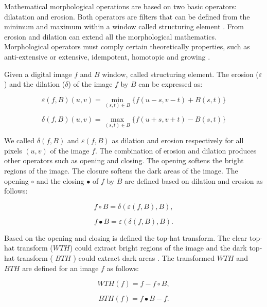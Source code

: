 Mathematical morphological operations are based on two basic operators: dilatation and erosion. Both operators are filters that can be defined from the minimum and maximum within a window called structuring element \cite{serra1986introduction}. From erosion and dilation can extend all the morphological mathematics. Morphological operators must comply certain theoretically properties, such as anti-extensive or extensive, idempotent, homotopic and growing \cite{serra1986introduction}.

Given a digital image $f$ and $B$ window, called structuring element. The erosion ($\varepsilon$) and the dilation ($\delta$) of the image $f$ by $B$ can be expressed as:

\begin{equation}
\varepsilon(f,B)(u,v)  = \min_{(s,t) \in B} \{f(u-s,v-t) + B(s,t) \}
\end{equation}

\begin{equation}
\delta(f,B)(u,v)  =  \max_{(s,t) \in B} \{f(u+s,v+t) - B(s,t) \}
\end{equation}

We called $\delta(f,B)$ and $\varepsilon(f,B)$ as dilation and erosion respectively for all pixels $(u,v)$ of the image $f$. The combination of erosion and dilation produces other operators such as opening and closing. The opening softens the bright regions of the image. The closure softens the dark areas of the image. The opening $\circ$ and the closing $\bullet$ of $f$ by $B$ are defined based on dilation and erosion as follows:

\begin{equation}
f\circ B = \delta(\varepsilon(f,B),B),
\end{equation}

\begin{equation}
f\bullet B = \varepsilon(\delta(f,B),B).
\end{equation}

Based on the opening and closing is defined the top-hat transform. The clear top-hat transform ($WTH$) could extract bright regions of the image and the dark top-hat transform ( $BTH$ )
could extract dark areas . The transformed $WTH$ and $BTH$ are defined for an image $f$ as follows:

\begin{equation}
WTH(f) = f - f\circ B,
\end{equation}

\begin{equation}
BTH(f) = f\bullet B - f. 
\end{equation}

